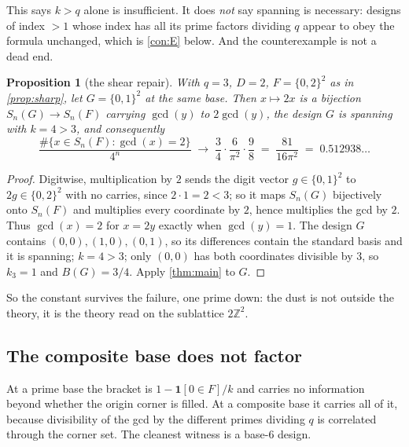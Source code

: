 \documentclass[11pt]{amsart}
\newtheorem{proposition}[theorem]{Proposition}
\theoremstyle{definition}
\theoremstyle{remark}
\begin{document}
This says $k>q$ alone is insufficient. It does \emph{not} say spanning is necessary: designs of index $>1$ whose index has all its prime factors dividing $q$ appear to obey the formula unchanged, which is \cref{con:E} below. And the counterexample is not a dead end.

\begin{proposition}[the shear repair]
\label{prop:shear}
With $q=3$, $D=2$, $F = \{0,2\}^{2}$ as in \cref{prop:sharp}, let $G = \{0,1\}^{2}$ at the same base. Then $x \mapsto 2x$ is a bijection $S_n(G) \to S_n(F)$ carrying $\gcd(y)$ to $2\gcd(y)$, the design $G$ is spanning with $k=4>3$, and consequently
\[
  \frac{\#\{x \in S_n(F) : \gcd(x) = 2\}}{4^{n}}
  \;\longrightarrow\; \frac{3}{4}\cdot\frac{6}{\pi^{2}}\cdot\frac{9}{8}
  \;=\; \frac{81}{16\pi^{2}} \;=\; 0.512938\ldots
\]
\end{proposition}

\begin{proof}
Digitwise, multiplication by $2$ sends the digit vector $g \in \{0,1\}^2$ to $2g \in \{0,2\}^2$ with no carries, since $2 \cdot 1 = 2 < 3$; so it maps $S_n(G)$ bijectively onto $S_n(F)$ and multiplies every coordinate by $2$, hence multiplies the gcd by $2$. Thus $\gcd(x)=2$ for $x = 2y$ exactly when $\gcd(y)=1$. The design $G$ contains $(0,0),(1,0),(0,1)$, so its differences contain the standard basis and it is spanning; $k = 4 > 3$; only $(0,0)$ has both coordinates divisible by $3$, so $k_3 = 1$ and $B(G) = 3/4$. Apply \cref{thm:main} to $G$.
\end{proof}

So the constant survives the failure, one prime down: the dust is not outside the theory, it is the theory read on the sublattice $2\mathbb{Z}^2$.

\subsection{The composite base does not factor}
\label{sec:factor}

At a prime base the bracket is $1 - \mathbf{1}[0\in F]/k$ and carries no information beyond whether the origin corner is filled. At a composite base it carries all of it, because divisibility of the gcd by the different primes dividing $q$ is correlated through the corner set. The cleanest witness is a base-$6$ design.
\end{document}
